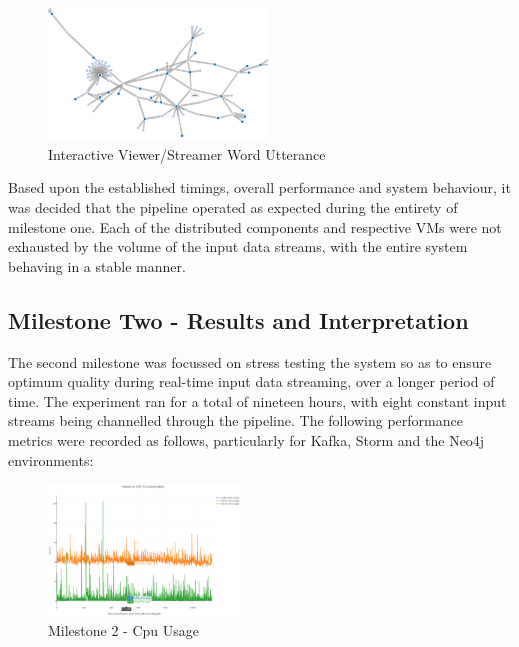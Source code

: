\documentclass[10pt,conference]{IEEEtran}
\begin{document}
\begin{figure}[h]
    \centering
    \includegraphics[height=3.5cm,keepaspectratio]{InteractiveViewer.png}
    \captionsetup                                 {justification=centering}
    \caption                                      {Interactive Viewer/Streamer Word Utterance}
    \label                                        {fig:InteractiveViewer}
\end{figure}

Based upon the established timings, overall performance and system behaviour, it was decided that the pipeline operated as expected during the entirety of milestone one. Each of the distributed components and respective VMs were not exhausted by the volume of the input data streams, with the entire system behaving in a stable manner.

\subsection{Milestone Two - Results and Interpretation}
The second milestone was focussed on stress testing the system so as to ensure optimum quality during real-time input data streaming, over a longer period of time. The experiment ran for a total of nineteen hours, with eight constant input streams being channelled through the pipeline. The following performance metrics were recorded as follows, particularly for Kafka, Storm and the Neo4j environments:

\begin{figure}[h]
    \centering
    \includegraphics[height=3.5cm,keepaspectratio]{Milestone2CpuUsage.png}
    \captionsetup                                 {justification=centering}
    \caption                                      {Milestone 2 - Cpu Usage}
    \label                                        {fig:Milestone2CpuUsage}
\end{figure}
\end{document}
